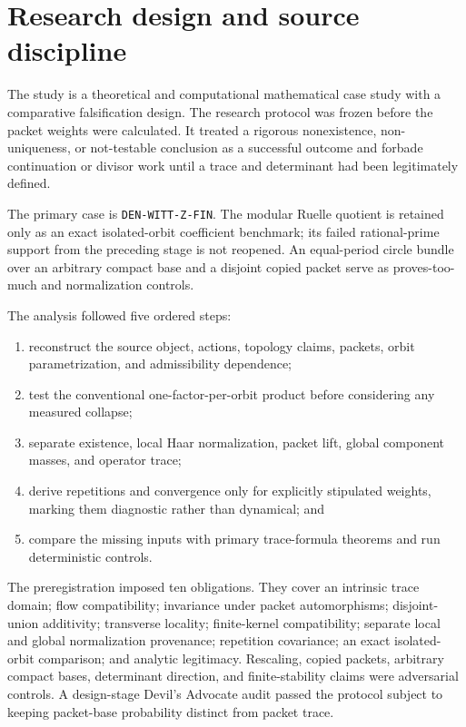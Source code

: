\documentclass[11pt]{article}
\theoremstyle{definition}
\theoremstyle{remark}
\begin{document}
\section{Research design and source discipline}
\label{sec:methods}

The study is a theoretical and computational mathematical case study with a
comparative falsification design.  The research protocol was frozen before
the packet weights were calculated.  It treated a rigorous nonexistence,
non-uniqueness, or not-testable conclusion as a successful outcome and
forbade continuation or divisor work until a trace and determinant had been
legitimately defined.

The primary case is \texttt{DEN-WITT-Z-FIN}.  The modular Ruelle quotient is
retained only as an exact isolated-orbit coefficient benchmark; its failed
rational-prime support from the preceding stage is not reopened.  An
equal-period circle bundle over an arbitrary compact base and a disjoint
copied packet serve as proves-too-much and normalization controls.

The analysis followed five ordered steps:
\begin{enumerate}[leftmargin=*,itemsep=2pt]
 \item reconstruct the source object, actions, topology claims, packets,
 orbit parametrization, and admissibility dependence;
 \item test the conventional one-factor-per-orbit product before considering
 any measured collapse;
 \item separate existence, local Haar normalization, packet lift, global
 component masses, and operator trace;
 \item derive repetitions and convergence only for explicitly stipulated
 weights, marking them diagnostic rather than dynamical; and
 \item compare the missing inputs with primary trace-formula theorems and run
 deterministic controls.
\end{enumerate}

The preregistration imposed ten obligations.  They cover an intrinsic trace
domain; flow compatibility; invariance under packet automorphisms;
disjoint-union additivity; transverse locality; finite-kernel compatibility;
separate local and global normalization provenance; repetition covariance;
an exact isolated-orbit comparison; and analytic legitimacy.  Rescaling,
copied packets, arbitrary compact bases, determinant direction, and
finite-stability claims were adversarial controls.  A design-stage Devil's
Advocate audit passed the protocol subject to keeping packet-base probability
distinct from packet trace.
\end{document}
